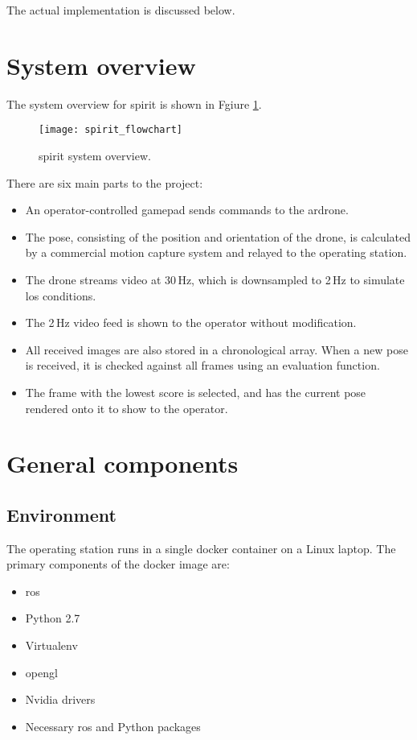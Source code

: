   The actual implementation is discussed below.

\section{System overview}
  The system overview for \gls{spirit} is shown in Fgiure \ref{fig:spirit_flowchart}.

  \begin{figure}[h]
    \centering
    \texttt{[image: spirit\_flowchart]}
    \caption[SPIRIT system overview]{\gls{spirit} system overview.}
    \label{fig:spirit_flowchart}
  \end{figure}

  There are six main parts to the project:

  \begin{itemize}
    \item An operator-controlled gamepad sends commands to the \gls{ardrone}.
    \item The pose, consisting of the position and orientation of the drone, is calculated by a commercial motion capture system and relayed to the operating station.
    \item The drone streams video at 30\,Hz, which is downsampled to 2\,Hz to simulate \gls{los} conditions.
    \item The 2\,Hz video feed is shown to the operator without modification.
    \item All received images are also stored in a chronological array.
	  When a new pose is received, it is checked against all frames using an evaluation function.
    \item The frame with the lowest score is selected, and has the current pose rendered onto it to show to the operator.
  \end{itemize}

\section{General components}
  \subsection{Environment}
    The operating station runs in a single \gls{docker} container on a Linux laptop.
    The primary components of the \gls{docker} image are:

    \begin{itemize}
      \item \gls{ros}
      \item Python 2.7
      \item Virtualenv
      \item \gls{opengl}
      \item Nvidia drivers
      \item Necessary \gls{ros} and Python packages
    \end{itemize}

